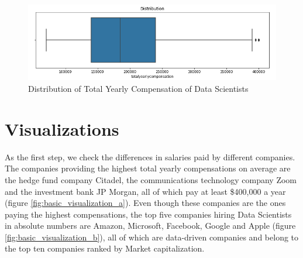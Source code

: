 \documentclass{article}
\begin{document}
 \begin{figure}
    \centering
    \includegraphics[width=0.7\linewidth]{NeurIPS_style/figures/Distribution.png}
    \caption{Distribution of Total Yearly Compensation of Data Scientists}
    \label{fig:distribution}
\end{figure}

\section{Visualizations}
As the first step, we check the differences in salaries paid by different companies. The companies providing the highest total yearly compensations on average are the hedge fund company Citadel, the communications technology company Zoom and the investment bank JP Morgan, all of which pay at least \$400,000 a year (figure \ref{fig:basic_visualization_a}). Even though these companies are the ones paying the highest compensations, the top five companies hiring Data Scientists in absolute numbers are Amazon, Microsoft, Facebook, Google and Apple (figure \ref{fig:basic_visualization_b}), all of which are data-driven companies and belong to the top ten companies ranked by Market capitalization.
\end{document}
